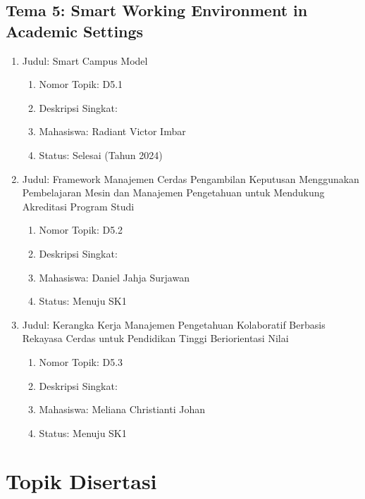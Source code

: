 \documentclass[
  letterpaper,
  DIV=11,
  numbers=noendperiod]{scrreprt}
\providecommand{\tightlist}{%
  \setlength{\itemsep}{0pt}\setlength{\parskip}{0pt}}
\begin{document}
\section{Tema 5: Smart Working Environment in Academic
Settings}\label{tema-5-smart-working-environment-in-academic-settings-2}

\begin{enumerate}
\def\labelenumi{\arabic{enumi}.}
\tightlist
\item
  Judul: Smart Campus Model

  \begin{enumerate}
  \def\labelenumii{\arabic{enumii}.}
  \tightlist
  \item
    Nomor Topik: D5.1
  \item
    Deskripsi Singkat:
  \item
    Mahasiswa: Radiant Victor Imbar
  \item
    Status: Selesai (Tahun 2024)
  \end{enumerate}
\item
  Judul: Framework Manajemen Cerdas Pengambilan Keputusan Menggunakan
  Pembelajaran Mesin dan Manajemen Pengetahuan untuk Mendukung
  Akreditasi Program Studi

  \begin{enumerate}
  \def\labelenumii{\arabic{enumii}.}
  \tightlist
  \item
    Nomor Topik: D5.2
  \item
    Deskripsi Singkat:
  \item
    Mahasiswa: Daniel Jahja Surjawan
  \item
    Status: Menuju SK1
  \end{enumerate}
\item
  Judul: Kerangka Kerja Manajemen Pengetahuan Kolaboratif Berbasis
  Rekayasa Cerdas untuk Pendidikan Tinggi Beriorientasi Nilai

  \begin{enumerate}
  \def\labelenumii{\arabic{enumii}.}
  \tightlist
  \item
    Nomor Topik: D5.3
  \item
    Deskripsi Singkat:
  \item
    Mahasiswa: Meliana Christianti Johan
  \item
    Status: Menuju SK1
  \end{enumerate}
\end{enumerate}


\chapter{Topik Disertasi}\label{topik-disertasi-2}
\end{document}
